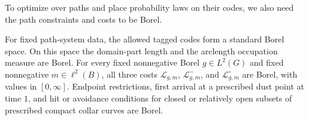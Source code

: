 To optimize over paths and place probability laws on their codes, we
also need the path constraints and costs to be Borel.

\begin{lemma}\label{lem:path-coding}
For fixed path-system data, the allowed tagged codes form a standard
Borel space.  On this space the domain-part length and the arclength
occupation measure are Borel.  For every fixed nonnegative Borel
$g\in L^2(G)$ and fixed nonnegative $m\in\ell^2(B)$, all three costs
$\mathcal L_{g,m}$, $\mathcal L^-_{g,m}$, and
$\mathcal L^\circ_{g,m}$ are Borel, with values in $[0,\infty]$.
Endpoint restrictions, first arrival at a prescribed dust point at
time $1$, and hit or avoidance conditions for closed or relatively
open subsets of prescribed compact collar curves are Borel.
\end{lemma}

